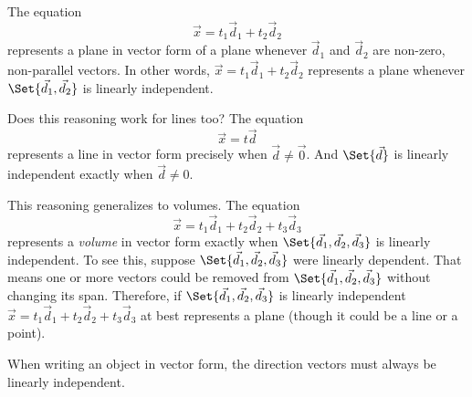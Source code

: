 
The equation
\[
	\vec x=t_1\vec d_1+t_2\vec d_2
\]
represents a plane in vector form of a plane whenever $\vec d_1$ and $\vec d_2$ are non-zero, non-parallel vectors.
In other words, 
	$\vec x=t_1\vec d_1+t_2\vec d_2$
	represents a plane whenever $\Set{\vec d_1,\vec d_2}$ is linearly independent.

Does this reasoning work for lines too? The equation
\[
	\vec x=t\vec d
\]
represents a line in vector form precisely when $\vec d\neq \vec 0$. And $\Set{\vec d}$ is linearly independent
exactly when $\vec d\neq 0$.

This reasoning generalizes to volumes. The equation
\[
	\vec x=t_1\vec d_1+t_2\vec d_2+t_3\vec d_3
\]
represents a \emph{volume} in vector form exactly when $\Set{\vec d_1,\vec d_2,\vec d_3}$ is linearly independent.
To see this, suppose $\Set{\vec d_1,\vec d_2,\vec d_3}$ were linearly dependent. That means one or
more vectors could be removed from $ \Set{\vec d_1,\vec d_2,\vec d_3}$ without changing its span.
Therefore, if $\Set{\vec d_1,\vec d_2,\vec d_3}$ is linearly independent $\vec x=t_1\vec d_1+t_2\vec d_2+t_3\vec d_3$
at best represents a plane (though it could be a line or a point).


\begin{emphbox}[Takeaway]
	When writing an object in vector form, the direction vectors must always be linearly independent.
\end{emphbox}

